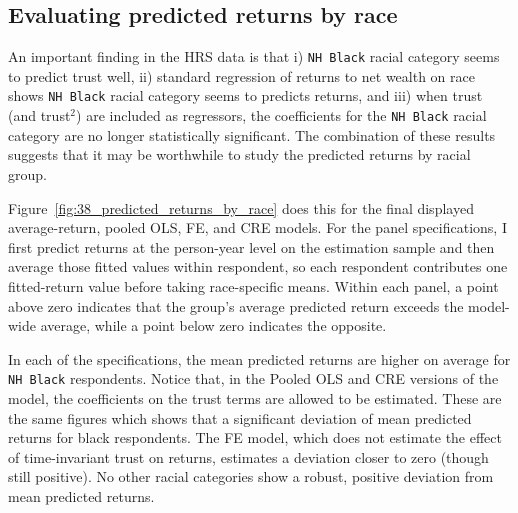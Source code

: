 \subsection{Evaluating predicted returns by race}

\par An important finding in the HRS data is that i) \texttt{NH Black} racial category seems to predict trust well, ii) standard regression of returns to net wealth on race shows \texttt{NH Black} racial category seems to predicts returns, and iii) when trust (and trust$^2$) are included as regressors, the coefficients for the \texttt{NH Black} racial category are no longer statistically significant. The combination of these results suggests that it may be worthwhile to study the predicted returns by racial group.   

\par Figure~\ref{fig:38_predicted_returns_by_race} does this for the final displayed average-return, pooled OLS, FE, and CRE models. For the panel specifications, I first predict returns at the person-year level on the estimation sample and then average those fitted values within respondent, so each respondent contributes one fitted-return value before taking race-specific means. Within each panel, a point above zero indicates that the group's average predicted return exceeds the model-wide average, while a point below zero indicates the opposite.

\par In each of the specifications, the mean predicted returns are higher on average for \texttt{NH Black} respondents. Notice that, in the Pooled OLS and CRE versions of the model, the coefficients on the trust terms are allowed to be estimated. These are the same figures which shows that a significant deviation of mean predicted returns for black respondents. The FE model, which does not estimate the effect of time-invariant trust on returns, estimates a deviation closer to zero (though still positive). No other racial categories show a robust, positive deviation from mean predicted returns.

